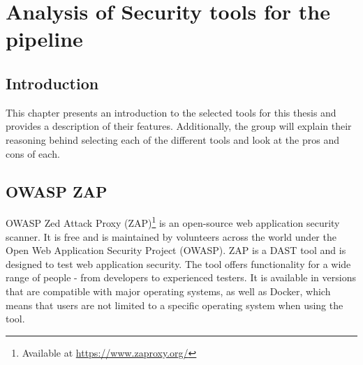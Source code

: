 \chapter{Analysis of Security tools for the pipeline}
\label{chap:Tools}
\section{Introduction}
This chapter presents an introduction to the selected tools for this thesis and provides a description of their features. Additionally, the group will explain their reasoning behind selecting each of the different tools and look at the pros and cons of each. 




\section{OWASP ZAP}
OWASP Zed Attack Proxy (ZAP)\footnote{Available at \url{https://www.zaproxy.org/}} is an open-source web application security scanner. It is free and is maintained by volunteers across the world under the Open Web Application Security Project (OWASP). ZAP is a DAST tool and is designed to test web application security. The tool offers functionality for a wide range of people - from developers to experienced testers. It is available in versions that are compatible with major operating systems, as well as Docker, which means that users are not limited to a specific operating system when using the tool.\cite{owaspZAP}

